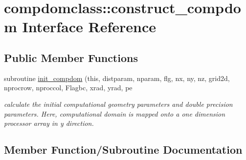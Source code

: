 \hypertarget{interfacecompdomclass_1_1construct__compdom}{}\section{compdomclass\+::construct\+\_\+compdom Interface Reference}
\label{interfacecompdomclass_1_1construct__compdom}
\subsection*{Public Member Functions}
\begin{DoxyCompactItemize}
\item 
subroutine \mbox{\hyperlink{interfacecompdomclass_1_1construct__compdom_a41290dc28d0207de5037fb58fb04ca2a}{init\+\_\+compdom}} (this, distparam, nparam, flg, nx, ny, nz, grid2d, nprocrow, nproccol, Flagbc, xrad, yrad, pe
\begin{DoxyCompactList}\small\item\em calculate the initial computational geometry parameters and double precision parameters. Here, computational domain is mapped onto a one dimension processor array in y direction. \end{DoxyCompactList}\end{DoxyCompactItemize}


\subsection{Member Function/\+Subroutine Documentation}
\mbox{\label{interfacecompdomclass_1_1construct__compdom_a41290dc28d0207de5037fb58fb04ca2a}} 
